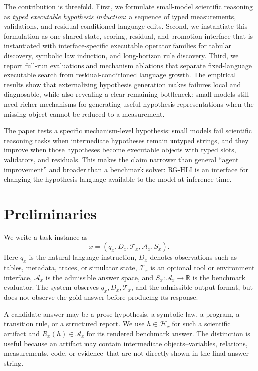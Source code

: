\documentclass[letterpaper]{article}
\newcommand{\methodshort}{\textsc{RG-HLI}\xspace}
\begin{document}
The contribution is threefold. First, we formulate small-model scientific
reasoning as \emph{typed executable hypothesis induction}: a sequence of typed
measurements, validations, and residual-conditioned language edits. Second, we
instantiate this formulation as one shared state, scoring, residual, and
promotion interface that is instantiated with interface-specific executable
operator families for tabular discovery, symbolic law induction, and
long-horizon rule discovery. Third, we report full-run evaluations and
mechanism ablations that separate fixed-language executable search from
residual-conditioned language growth. The empirical results show that
externalizing hypothesis generation makes failures local and diagnosable, while
also revealing a clear remaining bottleneck: small models still need richer
mechanisms for generating useful hypothesis representations when the missing
object cannot be reduced to a measurement.

The paper tests a specific mechanism-level hypothesis: small models fail
scientific reasoning tasks when intermediate hypotheses remain untyped strings,
and they improve when those hypotheses become executable objects with typed
slots, validators, and residuals. This makes the claim narrower than general
``agent improvement'' and broader than a benchmark solver: \methodshort is an
interface for changing the hypothesis language available to the model at
inference time.

\section{Preliminaries}

We write a task instance as
\begin{equation}
  x=(q_x,D_x,\mathcal{T}_x,\mathcal{A}_x,S_x).
\end{equation}
Here $q_x$ is the natural-language instruction, $D_x$ denotes observations such
as tables, metadata, traces, or simulator state, $\mathcal{T}_x$ is an optional
tool or environment interface, $\mathcal{A}_x$ is the admissible answer space,
and $S_x:\mathcal{A}_x\rightarrow\mathbb{R}$ is the benchmark evaluator. The
system observes $q_x,D_x,\mathcal{T}_x$, and the admissible output format, but
does not observe the gold answer before producing its response.

A candidate answer may be a prose hypothesis, a symbolic law, a program, a
transition rule, or a structured report. We use $h\in\mathcal{H}_x$ for such a
scientific artifact and $R_x(h)\in\mathcal{A}_x$ for its rendered benchmark
answer. The distinction is useful because an artifact may contain intermediate
objects--variables, relations, measurements, code, or evidence--that are not
directly shown in the final answer string.
\end{document}
